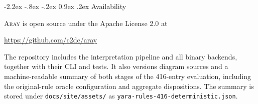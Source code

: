 \documentclass[11pt,twocolumn]{article}
\makeatletter
\newcommand{\tool}{\textsc{Aray}\xspace}
\newcommand{\code}[1]{\texttt{#1}}
\renewcommand\section{\@startsection{section}{1}{\z@}%
  {-2.2ex \@plus -.8ex \@minus -.2ex}%
  {0.9ex \@plus .2ex}%
  {\normalfont\large\bfseries}}
\makeatother
\begin{document}
\section{Availability}
\label{sec:availability}

\tool is open source under the Apache License 2.0 at
\begin{center}
  \url{https://github.com/c2dc/aray}
\end{center}
The repository includes the interpretation pipeline and all binary backends,
together with their CLI and tests. It also versions diagram sources and a
machine-readable summary of both stages of the 416-entry evaluation, including
the original-rule oracle configuration and aggregate dispositions. The summary
is stored under \code{docs/site/assets/} as
\code{yara-rules-416-deterministic.json}.

\begingroup
\footnotesize


\endgroup
\end{document}
